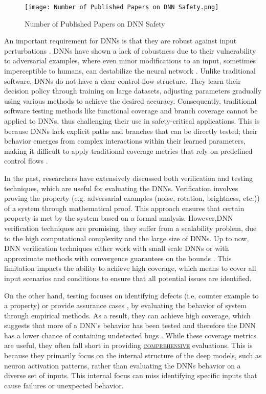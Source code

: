 \begin{figure*}
  \centering
  \texttt{[image: Number of Published Papers on DNN Safety.png]}
  \caption{Number of Published Papers on DNN Safety}
  \label{fig:no_publish}
\end{figure*}

An important requirement for DNNs is that they are robust against input perturbations \cite{HuangX}. 
DNNs have shown a lack of robustness due to their vulnerability to adversarial examples, where even minor modifications to an input, sometimes imperceptible to humans, can destabilize the neural network \cite{Goodfellow,Carlini}. Unlike traditional software, DNNs do not have a clear control-flow structure. They learn their decision policy through training on large datasets, adjusting parameters gradually using various methods to achieve the desired accuracy. Consequently, traditional software testing methods like functional coverage and branch coverage  cannot be applied to DNNs, thus challenging their use in safety-critical applications. This is because DNNs lack explicit paths and branches that can be directly tested; their behavior emerges from complex interactions within their learned parameters, making it difficult to apply traditional coverage metrics that rely on predefined control flows \cite{Sekhon}.


In the past, researchers have extensively discussed both verification and testing techniques, which are useful for evaluating the DNNs. Verification involves proving the property (e.g. adversarial examples (noise, rotation, brightness, etc.)) of a system through mathematical proof. This approach ensures that certain property is met by the system based on a formal analysis. However,DNN verification techniques are promising, they suffer from a scalability problem, due to the high computational complexity and the large size of DNNs. Up to now, DNN verification techniques either work with small scale DNNs or with approximate methods with convergence guarantees on the bounds \cite{HuangX}. This limitation impacts the ability to achieve high coverage, which means to cover all input scenarios and conditions to ensure that all potential issues are identified.

On the other hand, testing focuses on identifying defects (i.e, counter example to a property) or provide assurance cases \cite {Rushby}, by evaluating the behavior of system through empirical methods. As a result, they can achieve high coverage, which suggests that more of a DNN's behavior has been tested and therefore the DNN has a lower chance of containing undetected bugs \cite{HuangX}. While these coverage metrics are useful, they often fall short in providing \hyperref[gloss]{\textsc{comprehensive}}\label{comprehensive} evaluations. This is because they primarily focus on the internal structure of the deep models, such as neuron activation patterns, rather than evaluating the DNNs behavior on a diverse set of inputs. This internal focus can miss identifying specific inputs that cause failures or unexpected behavior.


